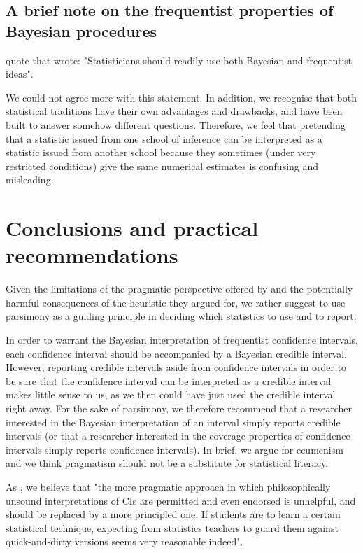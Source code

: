 \documentclass[a4paper,man,natbib,floatsintext,donotrepeattitle]{apa6}
\begin{document}
\subsection{A brief note on the frequentist properties of Bayesian procedures}

\cite{albers_credible_2018} quote \cite{bayarri_interplay_2004} that wrote: "Statisticians should readily use both Bayesian and frequentist ideas".

We could not agree more with this statement. In addition, we recognise that both statistical traditions have their own advantages and drawbacks, and have been built to answer somehow different questions. Therefore, we feel that pretending that a statistic issued from one school of inference can be interpreted as a statistic issued from another school because they sometimes (under very restricted conditions) give the same numerical estimates is confusing and misleading.

\section{Conclusions and practical recommendations}

Given the limitations of the pragmatic perspective offered by \cite{albers_credible_2018} and the potentially harmful consequences of the heuristic they argued for, we rather suggest to use parsimony as a guiding principle in deciding which statistics to use and to report.

In order to warrant the Bayesian interpretation of frequentist confidence intervals, each confidence interval should be accompanied by a Bayesian credible interval. However, reporting credible intervals aside from confidence intervals in order to be sure that the confidence interval can be interpreted as a credible interval makes little sense to us, as we then could have just used the credible interval right away. For the sake of parsimony, we therefore recommend that a researcher interested in the Bayesian interpretation of an interval simply reports credible intervals (or that a researcher interested in the coverage properties of confidence intervals simply reports confidence intervals). In brief, we argue for ecumenism and we think pragmatism should not be a substitute for statistical literacy. 

As \cite{hoekstra_improving_2018}, we believe that "the more pragmatic approach in which philosophically unsound interpretations of CIs are permitted and even endorsed is unhelpful, and should be replaced by a more principled one. If students are to learn a certain statistical technique, expecting from statistics teachers to guard them against quick-and-dirty versions seems very reasonable indeed".
\end{document}
